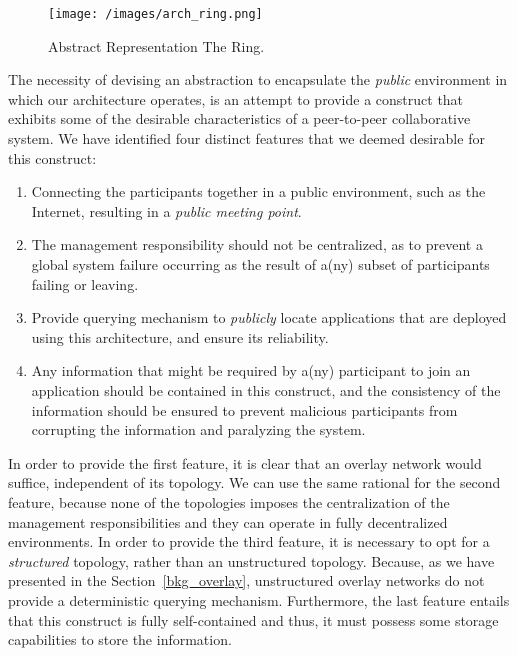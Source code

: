 \documentclass[12pt, titlepage]{uo_temp}
\begin{document}
     \begin{figure}[h]
       \texttt{[image: /images/arch\_ring.png]}
       \caption{Abstract Representation The Ring.} 
     \end{figure}

     The necessity of devising an abstraction to encapsulate the \emph{public} environment
     in which our architecture operates, is an attempt to provide a construct that
     exhibits some of the desirable characteristics of a peer-to-peer collaborative
     system. We have identified four distinct features that we deemed desirable for this
     construct:
    
     \begin{enumerate}
     \item Connecting the participants together in a public environment, such as the
       Internet, resulting in a \emph{public meeting point}.
     \item The management responsibility should not be centralized, as to prevent a global
       system failure occurring as the result of a(ny) subset of participants failing or
       leaving.
     \item Provide querying mechanism to \emph{publicly} locate applications that are
       deployed using this architecture, and ensure its reliability.
     \item Any information that might be required by a(ny) participant to join an application
       should be contained in this construct, and the consistency of the information should be
       ensured to prevent malicious participants from corrupting the information and paralyzing the
       system.
     \end{enumerate}
     
     In order to provide the first feature, it is clear that an overlay network would
     suffice, independent of its topology. We can use the same rational for the second
     feature, because none of the topologies imposes the centralization of the management
     responsibilities and they can operate in fully decentralized environments. In order
     to provide the third feature, it is necessary to opt for a \emph{structured}
     topology, rather than an unstructured topology. Because, as we have presented in the
     Section~\ref{bkg_overlay}, unstructured overlay networks do not provide a
     deterministic querying mechanism. Furthermore, the last feature entails that this
     construct is fully self-contained and thus, it must possess some storage capabilities
     to store the information.
     
\end{document}
